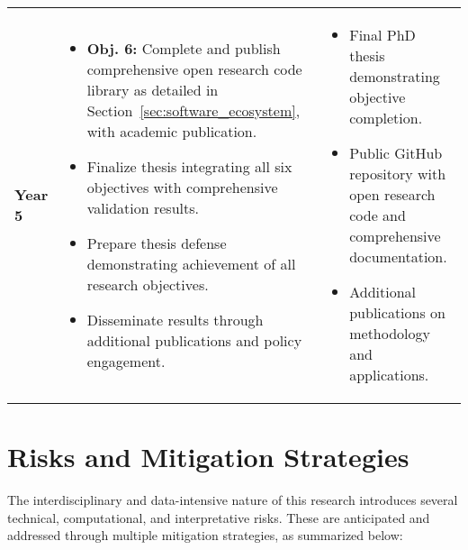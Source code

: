 \begin{longtable}{@{} >{\centering\arraybackslash}p{1.5cm} >{\centering\arraybackslash}p{7.5cm} >{\centering\arraybackslash}p{4.5cm} @{}}
	\addlinespace[0.8em]
	\textbf{Year 5}                      &
	\begin{minipage}[t]{8cm}\raggedright
		\begin{itemize}[left=0pt, labelsep=4pt, itemsep=2pt]
			\item \textbf{Obj. 6:} Complete and publish comprehensive open research code library as detailed in Section~\ref{sec:software_ecosystem}, with academic publication.
			\item Finalize thesis integrating all six objectives with comprehensive validation results.
			\item Prepare thesis defense demonstrating achievement of all research objectives.
			\item Disseminate results through additional publications and policy engagement.
		\end{itemize}
	\end{minipage} &
	\begin{minipage}[t]{3cm}\raggedright
		\begin{itemize}[left=0pt, labelsep=4pt, itemsep=2pt]
			\item Final PhD thesis demonstrating objective completion.
			\item Public GitHub repository with open research code and comprehensive documentation.
			\item Additional publications on methodology and applications.
		\end{itemize}
	\end{minipage}                                                               \\

\end{longtable}


\section{Risks and Mitigation Strategies}
\label{sec:risks_mitigation}

The interdisciplinary and data-intensive nature of this research introduces several technical, computational, and interpretative risks. These are anticipated and addressed through multiple mitigation strategies, as summarized below:

